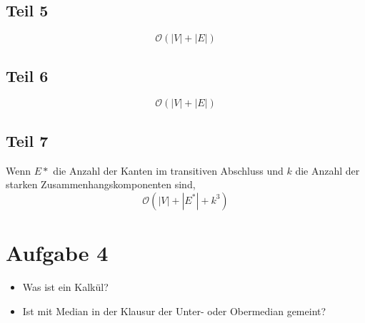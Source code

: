 \documentclass[10pt,a4paper]{article}
\begin{document}
\subsection{Teil 5}

\begin{equation}
  \mathcal{O}(|V| + |E|)
\end{equation}

\subsection{Teil 6}

\begin{equation}
  \mathcal{O}(|V| + |E|)
\end{equation}

\subsection{Teil 7}

Wenn $E*$ die Anzahl der Kanten im transitiven Abschluss und $k$ die Anzahl der starken Zusammenhangskomponenten sind,
\begin{equation}
  \mathcal{O}(|V| + |E^{*}| + k^{3})
\end{equation}

\section{Aufgabe 4}

\begin{itemize}
\item Was ist ein Kalkül?
\item Ist mit Median in der Klausur der Unter- oder Obermedian gemeint?
\end{itemize}
\end{document}
